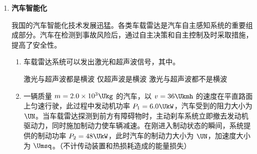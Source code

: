 \documentclass[\gkver]{gaokaozhenti}
\begin{document}
\begin{enumerate}
{2．（1）此过程是等压变化，根据盖-吕萨克定律，$\frac{V}{T}$ 为一常量，在 $V-T$ 图像中为一条过原点的倾斜直线。

（2）此实验压强保持不变，测量的是气体的温度和压强，因此无需记录大气压强，选项 B 错误；此实验是通过测量水温间接获得气体的温度，因此无需记录环境温度，选项 A 错误；但需要将封闭气体完全浸没在水中，选项 D 正确；此过程气体温度、体积一直在发生变化，无法等待温度读数稳定，选项 C 错误。
}

\item
\textbf{汽车智能化}

我国的汽车智能化技术发展迅猛。各类车载雷达是汽车自主感知系统的重要组成部分。汽车在检测到事故风险后，通过自主决策和自主控制及时采取措施，提高了安全性。
\begin{enumerate}
	\item
	车载雷达系统可以发出激光和超声波信号，其中。

	{激光与超声波都是横波}
	{仅超声波是横波}
	{激光与超声波都不是横波}

	\item
	一辆质量 $m = 2.0\times10^{3} \Ukg$ 的汽车，以 $v = 36 \Ukmh$ 的速度在平直路面上匀速行驶，此过程中发动机功率 $P_{1} = 6.0 \UkW$，汽车受到的阻力大小为 $\UN$。当车载雷达探测到前方有障碍物时，主动刹车系统立即撤去发动机驱动力，同时施加制动力使车辆减速。在刚进入制动状态的瞬间，系统提供的制动功率 $P_{2} = 48 \UkW$，此时汽车的制动力大小为 $\UN$，加速度大小为 $\Umsq$。（不计传动装置和热损耗造成的能量损失）
\end{enumerate}


\end{enumerate}
\end{document}
